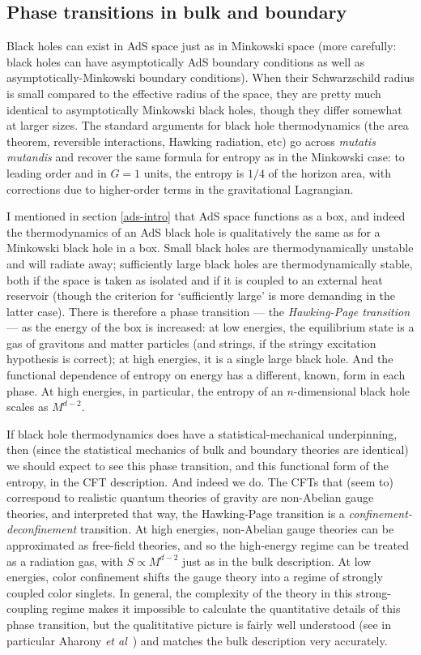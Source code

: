 \documentclass{article}
\begin{document}
\subsection{Phase transitions in bulk and boundary}

Black holes can exist in AdS space just as in Minkowski space (more carefully: black holes can have asymptotically AdS boundary conditions as well as asymptotically-Minkowski boundary conditions). When their Schwarzschild radius is small compared to the effective radius of the space, they are pretty much identical to asymptotically Minkowski black holes, though they differ somewhat at larger sizes. The standard arguments for black hole thermodynamics (the area theorem, reversible interactions, Hawking radiation, etc) go across \emph{mutatis mutandis} and recover the same formula for entropy as in the Minkowski case: to leading order and in $G=1$ units, the entropy is $1/4$ of the horizon area, with corrections due to higher-order terms in the gravitational Lagrangian.

I mentioned in section \ref{ads-intro} that AdS space functions as a box, and indeed the thermodynamics of an AdS black hole is qualitatively the same as for a Minkowski black hole in a box. Small black holes are thermodynamically unstable and will radiate away; sufficiently large black holes are thermodynamically stable, both if the space is taken as isolated and if it is coupled to an external heat reservoir (though the criterion for `sufficiently large' is more demanding in the latter case). There is therefore a phase transition --- the \emph{Hawking-Page transition} \cite{hawkingpage} --- as the energy of the box is increased: at low energies, the equilibrium state is a gas of gravitons and matter particles (and strings, if the stringy excitation hypothesis is correct); at high energies, it is a single large black hole. And the functional dependence of entropy on energy has a different, known, form in each phase. At high energies, in particular, the entropy of an $n$-dimensional black hole scales as $M^{d-2}$. 

If black hole thermodynamics does have a statistical-mechanical underpinning, then (since the statistical mechanics of bulk and boundary theories are identical) we should expect to see this phase transition, and this functional form of the entropy, in the CFT description. And indeed we do. The CFTs that (seem to) correspond to realistic quantum theories of gravity are non-Abelian gauge theories, and interpreted that way, the Hawking-Page transition is a \emph{confinement-deconfinement} transition. At high energies, non-Abelian gauge theories can be approximated as free-field theories, and so the high-energy regime can be treated as a radiation gas, with $S\propto M^{d-2}$ just as in the bulk description. At low energies, color confinement shifts the gauge theory into a regime of strongly coupled color singlets. In general, the complexity of the theory in this strong-coupling regime makes it impossible to calculate the quantitative details of this phase transition, but the qualititative picture is fairly well understood (see in particular Aharony \emph{et al}~\citeyear{hagedorndeconfinementadscft}) and matches the bulk description very accurately.
\end{document}
